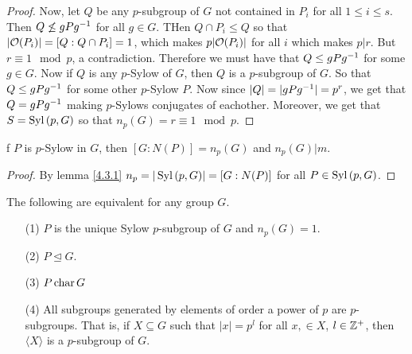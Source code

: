 \begin{proof}
  Now, let $Q$ be any $p$-subgroup of $G$ not contained in  $P_i$ for all  $1
  \leq i \leq s$. Then  $Q \not\leq gPg^{-1}$ for all $g \in G$. THen  $Q
  \cap P_i \leq Q$ so that $|\mathcal{O}(P_i)|=[Q:Q \cap P_i]=1$, which makes
  $p|\mathcal{O}(P_i)|$ for all $i$ which makes  $p|r$. But  $r \equiv 1 \mod{p}$, a
  contradiction. Therefore we must have that $Q \leq gPg^{-1}$ for some $g
  \in G$. Now if $Q$ is any  $p$-Sylow of  $G$, then $Q$ is a $p$-subgroup of
  $G$. So that  $Q \leq gPg^{-1}$ for some other $p$-Sylow $P$. Now since
  $|Q|=|gPg^{-1}|=p^r$, we get that $Q=gPg^{-1}$ making $p$-Sylows
  conjugates of eachother. Moreover, we get that $S=\operatorname{Syl}{(p,G)}$ so that
  $n_p(G)=r \equiv 1 \mod{p}$.
\end{proof}
\begin{corollary}
  f $P$ is $p$-Sylow in $G$, then  $[G:N(P)]=n_p(G)$ and $n_p(G)|m$.
\end{corollary}
\begin{proof}
  By lemma \ref{4.3.1} $n_p=|\operatorname{Syl}{(p,G)}|=[G:N(P)]$ for all $P \in
  \operatorname{Syl}{(p,G)}$.
\end{proof}
\begin{corollary}
  The following are equivalent for any group $G$.
  \begin{enumerate}
    \item[(1)] $P$ is the unique Sylow  $p$-subgroup of  $G$ and
      $n_p(G)=1$.

    \item[(2)] $P \unlhd G$.

    \item[(3)] $P \operatorname{char} G$

    \item[(4)] All subgroups generated by elements of order a power of $p$
      are $p$-subgroups. That is, if $X \subseteq G$ such that
      $|x|=p^l$ for all $x, \in X$,  $l \in \mathbb{Z}^+$, then  $\langle X
      \rangle$ is a $p$-subgroup of  $G$.
  \end{enumerate}
\end{corollary}
